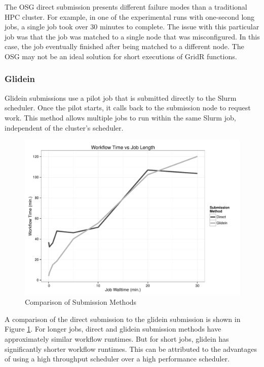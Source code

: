 The OSG direct submission presents different failure modes than a traditional HPC cluster.  For example, in one of the experimental runs with one-second long jobs, a single job took over 30 minutes to complete.  The issue with this particular job was that the job was matched to a single node that was misconfigured.  In this case, the job eventually finished after being matched to a different node.  The OSG may not be an ideal solution for short executions of GridR functions.

\subsubsection{Glidein}
Glidein submissions use a pilot job that is submitted directly to the Slurm scheduler.  Once the pilot starts, it calls back to the submission node to request work.  This method allows multiple jobs to run within the same Slurm job, independent of the cluster's scheduler.  

\begin{figure}[h!t]
\centering
\includegraphics[width=\textwidth]{BoscoRImages/ComparisonPlot-color.pdf}
\caption{Comparison of Submission Methods}
\label{fig:comparesubmit}
\end{figure}

A comparison of the direct submission to the glidein submission is shown in Figure \ref{fig:comparesubmit}.  For longer jobs, direct and glidein submission methods have approximately similar workflow runtimes.  But for short jobs, glidein has significantly shorter workflow runtimes.  This can be attributed to the advantages of using a high throughput scheduler over a high performance scheduler.

